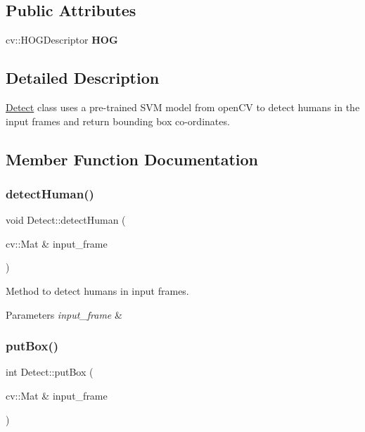 \subsection*{Public Attributes}
\begin{DoxyCompactItemize}
\item 
\mbox{\label{classDetect_a7b4db15c556678a0f8e7ec1f925bd79d}} 
cv\+::\+H\+O\+G\+Descriptor {\bfseries H\+OG}
\end{DoxyCompactItemize}


\subsection{Detailed Description}
\hyperlink{classDetect}{Detect} class uses a pre-\/trained S\+VM model from open\+CV to detect humans in the input frames and return bounding box co-\/ordinates. 

\subsection{Member Function Documentation}
\mbox{\label{classDetect_a178c6c5220c2726f0adc6aa464dff543}} 
\subsubsection{\texorpdfstring{detect\+Human()}{detectHuman()}}
{\footnotesize\ttfamily void Detect\+::detect\+Human (\begin{DoxyParamCaption}\item[{cv\+::\+Mat \&}]{input\+\_\+frame }\end{DoxyParamCaption})}



Method to detect humans in input frames. 


\begin{DoxyParams}{Parameters}
{\em input\+\_\+frame} & \\
\hline
\end{DoxyParams}
\mbox{\label{classDetect_a46940b188132ade41fede81831144f00}} 
\subsubsection{\texorpdfstring{put\+Box()}{putBox()}}
{\footnotesize\ttfamily int Detect\+::put\+Box (\begin{DoxyParamCaption}\item[{cv\+::\+Mat \&}]{input\+\_\+frame }\end{DoxyParamCaption})}



